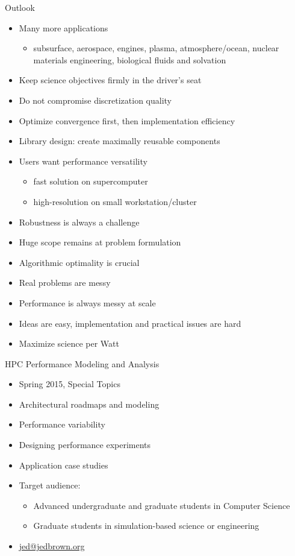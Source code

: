 \documentclass{beamer}
\begin{document}
\begin{frame}{Outlook}
  \begin{itemize}
  \item Many more applications
    \begin{itemize}
    \item subsurface, aerospace, engines, plasma, atmosphere/ocean, nuclear materials engineering, biological fluids and solvation
    \end{itemize}
  \item Keep science objectives firmly in the driver's seat
  \item Do not compromise discretization quality
  \item Optimize convergence first, then implementation efficiency
  \item Library design: create maximally reusable components
  \item Users want performance versatility
    \begin{itemize}
    \item fast solution on supercomputer
    \item high-resolution on small workstation/cluster
    \end{itemize}
  \item Robustness is always a challenge
  \item Huge scope remains at problem formulation
  \item Algorithmic optimality is crucial
  \item Real problems are messy
  \item Performance is always messy at scale
  \item Ideas are easy, implementation and practical issues are hard
  \item Maximize science per Watt
  \end{itemize}
\end{frame}

\begin{frame}{HPC Performance Modeling and Analysis}
  \begin{itemize}
  \item Spring 2015, Special Topics
  \item Architectural roadmaps and modeling
  \item Performance variability
  \item Designing performance experiments
  \item Application case studies
  \item Target audience:
    \begin{itemize}
    \item Advanced undergraduate and graduate students in Computer Science
    \item Graduate students in simulation-based science or engineering
    \end{itemize}
  \item \url{jed@jedbrown.org}
  \end{itemize}
\end{frame}
\end{document}
